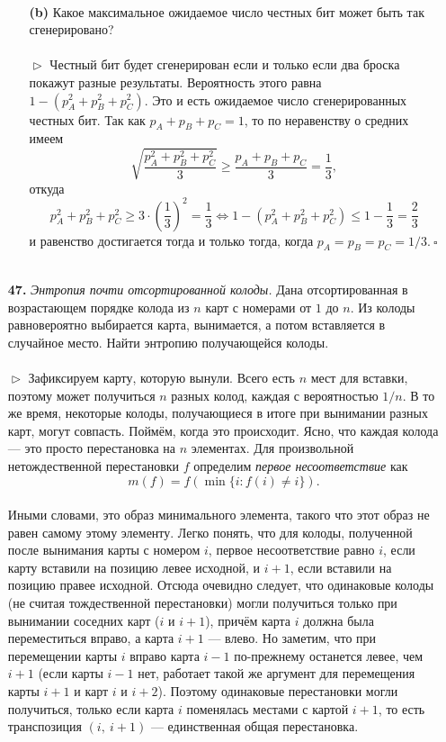 \documentclass{article}
\renewcommand{\ge}{\geqslant}
\renewcommand{\le}{\leqslant}
\begin{document}
\begin{enumerate}
\begin{enumerate}
\\
\item[\bfseries (b)] Какое максимальное ожидаемое число честных бит может быть так сгенерировано?
\\\\$\vartriangleright$ Честный бит будет сгенерирован если и только если два броска покажут разные результаты. Вероятность этого равна $1 - (p_A^2 + p_B^2 + p_C^2)$. Это и есть ожидаемое число сгенерированных честных бит. Так как $p_A + p_B + p_C = 1$, то по неравенству о средних имеем 
$$\sqrt{\frac{p_A^2 + p_B^2 + p_C^2}{3}} \ge \frac{p_A + p_B + p_C}{3} = \frac{1}{3},$$ откуда $$p_A^2 + p_B^2 + p_C^2 \ge 3 \cdot \left(\frac{1}{3}\right)^2 = \frac{1}{3} \Longleftrightarrow 1 - (p_A^2 + p_B^2 + p_C^2) \le 1 - \frac{1}{3} = \frac{2}{3}$$
и равенство достигается тогда и только тогда, когда $p_A = p_B = p_C = 1/3.\ \square$
\\\\
\end{enumerate}
\item[\bfseries 47.] \textit{Энтропия почти отсортированной колоды.} Дана отсортированная в возрастающем порядке колода из $n$ карт с номерами от $1$ до $n$. Из колоды равновероятно выбирается карта, вынимается, а потом вставляется в случайное место. Найти энтропию получающейся колоды.
\\\\$\vartriangleright$ Зафиксируем карту, которую вынули. Всего есть $n$ мест для вставки, поэтому может получиться $n$ разных колод, каждая с вероятностью $1/n$. В то же время, некоторые колоды, получающиеся в итоге при вынимании разных карт, могут совпасть. Поймём, когда это происходит. Ясно, что каждая колода --- это просто перестановка на $n$ элементах. Для произвольной нетождественной перестановки $f$ определим \textit{первое несоответствие} как $$m(f) = f(\min \{i: f(i) \ne i\}).$$
\\Иными словами, это образ минимального элемента, такого что этот образ не равен самому этому элементу. 
\newpage Легко понять, что для колоды, полученной после вынимания карты с номером $i$, первое несоответствие равно $i$, если карту вставили на позицию левее исходной, и $i + 1$, если вставили на позицию правее исходной. Отсюда очевидно следует, что одинаковые колоды (не считая тождественной перестановки) могли получиться только при вынимании соседних карт ($i$ и $i + 1$), причём карта $i$ должна была переместиться вправо, а карта $i + 1$ --- влево. Но заметим, что при перемещении карты $i$ вправо карта $i - 1$ по-прежнему останется левее, чем $i + 1$ (если карты $i - 1$ нет, работает такой же аргумент для перемещения карты $i + 1$ и карт $i$ и $i + 2$). Поэтому одинаковые перестановки могли получиться, только если карта $i$ поменялась местами с картой $i + 1$, то есть транспозиция $(i,\ i + 1)$ --- единственная общая перестановка. 

\end{enumerate}
\end{document}
